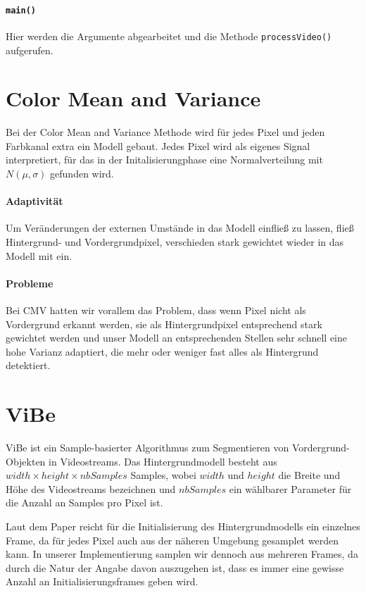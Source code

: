 \documentclass[]{scrartcl}
\begin{document}
\paragraph{\texttt{main()}} Hier werden die Argumente abgearbeitet und die Methode \texttt{processVideo()} aufgerufen.

\section{Color Mean and Variance}\label{sec:cmv}
Bei der Color Mean and Variance Methode wird für jedes Pixel und jeden Farbkanal extra ein Modell gebaut. Jedes Pixel wird als eigenes Signal interpretiert, für das in der Initalisierungphase eine Normalverteilung mit $N(\mu, \sigma)$ gefunden wird. 

\paragraph{Adaptivit\"at} 
Um Veränderungen der externen Umst\"ande in das Modell einflie\ss{} zu lassen, flie\ss{} Hintergrund- und Vordergrundpixel, verschieden stark gewichtet wieder in das Modell mit ein.
\paragraph{Probleme} 
Bei CMV hatten wir vorallem das Problem, dass wenn Pixel nicht als Vordergrund erkannt werden, sie als Hintergrundpixel entsprechend stark gewichtet werden und unser Modell an entsprechenden Stellen sehr schnell eine hohe Varianz adaptiert, die mehr oder weniger fast alles als Hintergrund detektiert.

\section{ViBe}\label{sec:vibe}
ViBe ist ein Sample-basierter Algorithmus zum Segmentieren von Vordergrund-Objekten in Videostreams. Das Hintergrundmodell besteht aus $width \times height \times nbSamples$ Samples, wobei $width$ und $height$ die Breite und H\"ohe des Videostreams bezeichnen und $nbSamples$ ein w\"ahlbarer Parameter f\"ur die Anzahl an Samples pro Pixel ist. 

Laut dem Paper reicht f\"ur die Initialisierung des Hintergrundmodells ein einzelnes Frame, da f\"ur jedes Pixel auch aus der n\"aheren Umgebung gesamplet werden kann. In unserer Implementierung samplen wir dennoch aus mehreren Frames, da durch die Natur der Angabe davon auszugehen ist, dass es immer eine gewisse Anzahl an Initialisierungsframes geben wird. 
\end{document}
